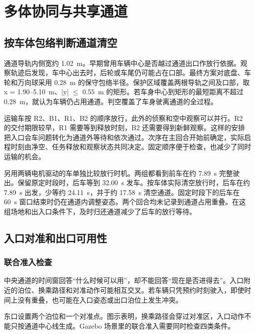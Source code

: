 \clearpage

\section{多体协同与共享通道}\label{sec:3}

\subsection{按车体包络判断通道清空}\label{sec:3.1}

通道导轨内侧宽约 1.02~m。早期曾用车辆中心是否越过通道出口作放行依据。观察轨迹后发现，车中心出去时，后轮或车尾仍可能占在口部。最终方案对底盘、车轮和万向球采用 0.28~m 的保守包络半径。保护区域覆盖两根导轨之间及口部，取 x = 1.90–5.10~m、|y| \ensuremath{\leq} 0.55~m 的矩形。若车身中心到矩形的最短距离不超过 0.28~m，就认为车辆仍占用通道。判空覆盖了车身驶离通道的全过程。

运输车按 R2、B1、R1、B2 的顺序放行，此外的侦察和空中观察可以并行。R2 的交付期限较早，R1 需要等到释放时刻，B2 还需要得到新鲜观察。这样的安排把入口会车问题转化为通道外等待和依次通过。次序在主回合开始前确定，实际启程时刻由净空、任务释放和观察状态共同决定。固定顺序便于检查，也减少了同时运输的机会。

另用两辆电机驱动的车单独比较放行时机。两组都看到前车在约 7.89~s 完整驶出。保留原定时段时，后车等到 32.00~s 发车。按车体实际清空放行时，后车在约 7.89~s 出发，少等约 24.11~s，并于约 17.58~s 清空通道。固定时段下的后车在 60~s 窗口结束时仍在通道内调整姿态。两个回合均未记录到通道占用重叠。在这组场地和出入口条件下，及时归还通道减少了后车的放行等待。

\subsection{入口对准和出口可用性}\label{sec:3.2}

\subsubsection*{联合准入检查}

中央通道的时间窗回答“什么时候可以用”，却不能回答“现在是否进得去”。入口附近的泊位、换乘路径和对准动作可能相互交叉。若车辆只凭预约时刻驶入，即使时间上没有重叠，也可能在入口姿态或出口泊位上发生冲突。

东口设置两个泊位和一个对准点。图示表明，换乘路径会穿过对准区，入口动作不能只按通道中心线生成。Gazebo 场景里的联合准入需要同时检查四类条件。


